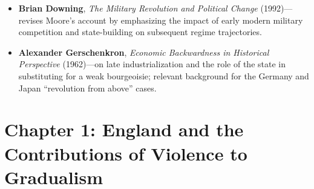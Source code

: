 \documentclass[12pt]{article}
\begin{document}
\begin{itemize}[leftmargin=*, itemsep=4pt]
    \item \textbf{Brian Downing}, \textit{The Military Revolution and Political Change} (1992)---revises Moore's account by emphasizing the impact of early modern military competition and state-building on subsequent regime trajectories.
    \item \textbf{Alexander Gerschenkron}, \textit{Economic Backwardness in Historical Perspective} (1962)---on late industrialization and the role of the state in substituting for a weak bourgeoisie; relevant background for the Germany and Japan ``revolution from above'' cases.
\end{itemize}

\section{Chapter 1: England and the Contributions of Violence to Gradualism}
\end{document}
